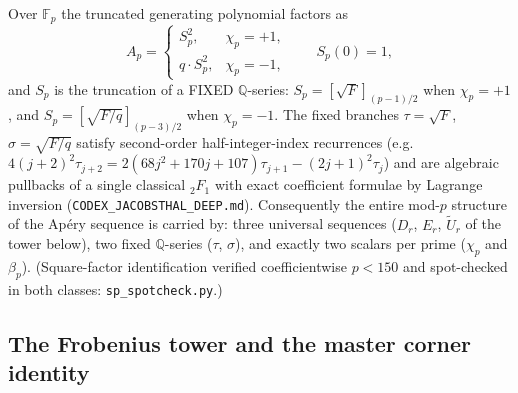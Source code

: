 \begin{theorem}[structure]\label{thm:structure}
Over $\mathbb F_p$ the truncated generating polynomial factors as
\[
A_p=\begin{cases} S_p^2,&\chi_p=+1,\\ q\cdot S_p^2,&\chi_p=-1,\end{cases}
\qquad S_p(0)=1,
\]
and $S_p$ is the truncation of a FIXED $\mathbb Q$-series:
$S_p=[\sqrt F]_{(p-1)/2}$ when $\chi_p=+1$, and
$S_p=[\sqrt{F/q}]_{(p-3)/2}$ when $\chi_p=-1$.  The fixed branches
$\tau=\sqrt F$, $\sigma=\sqrt{F/q}$ satisfy second-order half-integer-index
recurrences (e.g.\ $4(j+2)^2\tau_{j+2}=2(68j^2+170j+107)\tau_{j+1}-(2j+1)^2\tau_j$)
and are algebraic pullbacks of a single classical ${}_2F_1$ with exact
coefficient formulae by Lagrange inversion
(\texttt{CODEX\_JACOBSTHAL\_DEEP.md}).  Consequently the entire mod-$p$
structure of the Ap\'ery sequence is carried by: three universal sequences
($D_r$, $E_r$, $\tilde U_r$ of the tower below), two fixed $\mathbb Q$-series
($\tau$, $\sigma$), and exactly two scalars per prime ($\chi_p$ and $\beta_p$).
(Square-factor identification verified coefficientwise $p<150$ and
spot-checked in both classes: \texttt{sp\_spotcheck.py}.)
\end{theorem}

\subsection{The Frobenius tower and the master corner identity}

